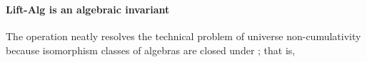 \begin{code}
\AgdaSpace{}%
\AgdaSpace{}%
\AgdaSpace{}%
\AgdaSymbol{(}\AgdaSpace{}%
\AgdaSpace{}%
\AgdaSpace{}%
\AgdaSpace{}%
\AgdaSymbol{)}\AgdaSpace{}%
\AgdaSpace{}%
\<%
\\
%
\>[2]\AgdaSpace{}%
\AgdaSpace{}%
\AgdaSymbol{=}\AgdaSpace{}%
\AgdaSpace{}%
\AgdaSymbol{(}\AgdaSpace{}%
\AgdaSpace{}%
\AgdaSpace{}%
\AgdaSpace{}%
\AgdaSpace{}%
\AgdaSymbol{(}\AgdaSpace{}%
\AgdaSpace{}%
\AgdaSymbol{(}\AgdaSpace{}%
\AgdaSpace{}%
\AgdaSpace{}%
\AgdaSpace{}%
\AgdaSpace{}%
\AgdaSymbol{)))}\AgdaSpace{}%
\AgdaSymbol{(}\AgdaSpace{}%
\AgdaSpace{}%
\AgdaSymbol{)}\<%
\end{code}
\fi
\paragraph*{Lift-Alg is an algebraic invariant}
The  operation neatly resolves the technical problem of
universe non-cumulativity because isomorphism classes of algebras are closed under ; that is,
\ifshort\else


